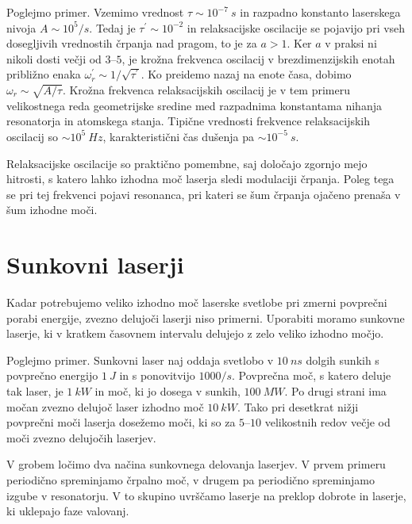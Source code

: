 Poglejmo primer. Vzemimo vrednost $\tau \sim 10^{-7}~\si{s}$ in razpadno
konstanto laserskega nivoja $A \sim 10^5/\si{s}$. Tedaj je $\tau^{\prime}\sim 10^{-2}$ 
in relaksacijske oscilacije se pojavijo pri vseh dosegljivih vrednostih črpanja 
nad pragom, to je za $a>1$. Ker $a$ v praksi ni nikoli dosti večji od $3$--$5$, 
je krožna frekvenca oscilacij v brezdimenzijskih enotah približno
enaka $\omega^{\prime}_r\sim 1/\sqrt{\tau^{\prime}}$. Ko preidemo
nazaj na enote časa, dobimo $\omega_r\sim \sqrt{A/\tau}$. Krožna frekvenca 
relaksacijskih oscilacij je v tem primeru velikostnega reda geometrijske 
sredine med razpadnima konstantama nihanja resonatorja in atomskega stanja. 
Tipične vrednosti frekvence relaksacijskih oscilacij so $\sim 10^5~\si{Hz}$, 
karakteristični čas dušenja pa $\sim 10^{-5}~\si{s}$.
\begin{remark}
Relaksacijske oscilacije so praktično pomembne, saj določajo zgornjo mejo
hitrosti, s katero lahko izhodna moč laserja sledi modulaciji črpanja.
Poleg tega se pri tej frekvenci pojavi resonanca, pri kateri se šum črpanja
ojačeno prenaša v šum izhodne moči. 
\end{remark}

\section{Sunkovni laserji}
Kadar potrebujemo veliko izhodno moč laserske svetlobe pri zmerni povprečni porabi 
energije, zvezno delujoči laserji 
niso primerni. Uporabiti moramo sunkovne laserje, 
ki v kratkem časovnem intervalu delujejo z zelo veliko izhodno močjo. 

Poglejmo primer. 
Sunkovni laser naj oddaja svetlobo v $10~\si{ns}$ dolgih sunkih 
s povprečno energijo $1~\si{J}$ in s ponovitvijo $1000/\si{s}$.
Povprečna moč, s katero deluje tak laser, je $1~\si{kW}$ in moč, ki jo 
dosega v sunkih, $100~\si{MW}$. Po drugi strani ima močan zvezno delujoč laser  
izhodno moč $10~\si{kW}$. Tako pri desetkrat nižji povprečni moči laserja
dosežemo moči, ki so za $5$--$10$ velikostnih redov večje od moči 
zvezno delujočih laserjev. 

V grobem ločimo dva načina sunkovnega delovanja laserjev. V prvem primeru
periodično spreminjamo črpalno moč, v drugem pa periodično 
spreminjamo izgube v resonatorju. V to skupino uvrščamo laserje na 
preklop dobrote in laserje, ki uklepajo faze valovanj.   


